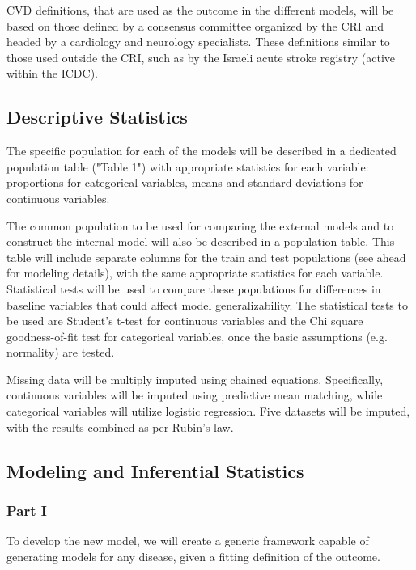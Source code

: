 \documentclass[a4paper,12pt]{article}
\begin{document}
	CVD definitions, that are used as the outcome in the different models, will be based on those defined by a consensus committee organized by the CRI and headed by a cardiology and neurology specialists. These definitions similar to those used outside the CRI, such as by the Israeli acute stroke registry\cite{ICDC2017} (active within the ICDC).
	
	\subsection{Descriptive Statistics}
	The specific population for each of the models will be described in a dedicated population table ("Table 1") with appropriate statistics for each variable: proportions for categorical variables, means and standard deviations for continuous variables.
	
	The common population to be used for comparing the external models and to construct the internal model will also be described in a population table. This table will include separate columns for the train and test populations (see ahead for modeling details), with the same appropriate statistics for each variable. Statistical tests will be used to compare these populations for differences in baseline variables that could affect model generalizability. The statistical tests to be used are Student's t-test for continuous variables and the Chi square goodness-of-fit test for categorical variables, once the basic assumptions (e.g. normality) are tested.
	
	Missing data will be multiply imputed using chained equations. Specifically, continuous variables will be imputed using predictive mean matching, while categorical variables will utilize logistic regression\cite{Buuren2011}. Five datasets will be imputed, with the results combined as per Rubin's law\cite{Rubin1987}.
	
	\subsection{Modeling and Inferential Statistics}
	
		\subsubsection{Part I}
		
		To develop the new model, we will create a generic framework capable of generating models for any disease, given a fitting definition of the outcome.
		
\end{document}
